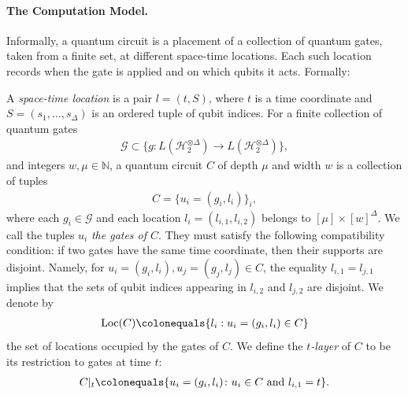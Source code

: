 
\label{subsection:model}
\newcommand{\comDAG}{\pi_{C[\mathcal{E}]}} 
\paragraph{The Computation Model.} Informally, a quantum circuit is a placement of a collection of quantum gates, taken from a finite set, at different space-time locations. Each such location records when the gate is applied and on which qubits it acts. Formally:

\begin{definition}
  \label{def:quantcirc}
  A \emph{space-time location} is a pair $l=(t,S)$, where $t$ is a time coordinate and $S=(s_{1},\ldots,s_{\Delta})$ is an ordered tuple of qubit indices. For a finite collection of quantum gates 
  \begin{equation*}
    \begin{split}
      \mathcal{G} \subset \Big\{ g \colon L(\mathcal{H}_{2}^{\otimes \Delta}) \to L(\mathcal{H}_{2}^{\otimes \Delta}) \Big\},
    \end{split}
  \end{equation*}
  and integers $w,\mu\in\mathbb{N}$, a quantum circuit $C$ of depth $\mu$ and width $w$ is a collection of tuples
  \begin{equation*}
    \begin{split}
      C=\{u_i=(g_i,l_i)\}_i,
    \end{split}
  \end{equation*}
  where each $g_i\in\mathcal{G}$ and each location $l_i=(l_{i,1},l_{i,2})$ belongs to $[\mu]\times [w]^{\Delta}$. We call the tuples $u_i$ \textit{the gates of $C$}. They must satisfy the following compatibility condition: if two gates have the same time coordinate, then their supports are disjoint. Namely, for $u_i=(g_i,l_i),u_j=(g_j,l_j)\in C$, the equality $l_{i,1}=l_{j,1}$ implies that the sets of qubit indices appearing in $l_{i,2}$ and $l_{j,2}$ are disjoint. We denote by
  \begin{equation*}
    \begin{split}
      \operatorname{Loc}(C) \colonequals \{l_i : u_i=(g_i,l_i)\in C\}
    \end{split}
  \end{equation*}
  the set of locations occupied by the gates of $C$. We define the \textit{$t$-layer} of $C$ to be its restriction to gates at time $t$:
  \begin{equation*}
    \begin{split}
      C|_{t} \colonequals \{u_i=(g_i,l_i)\colon u_i\in C \text{ and } l_{i,1}=t\}.
    \end{split}
  \end{equation*}
\end{definition}
